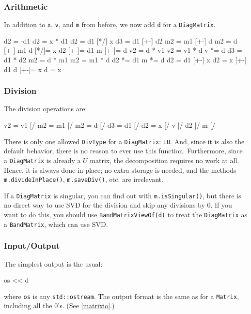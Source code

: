 \documentclass[twoside,letterpaper,11pt]{article}
\renewcommand{\tt}[1]{{\lstinline {#1}}}
\begin{document}
\subsubsection{Arithmetic}

In addition to \tt{x}, \tt{v}, and \tt{m} from before, we now add \tt{d} for a \tt{DiagMatrix}.

\begin{tmvcode}
d2 = -d1
d2 = x * d1
d2 = d1 [*/] x
d3 = d1 [+-] d2
m2 = m1 [+-] d
m2 = d [+-] m1
d [*/]= x
d2 [+-]= d1
m [+-]= d
v2 = d * v1
v2 = v1 * d
v *= d
d3 = d1 * d2
m2 = d * m1
m2 = m1 * d
d2 *= d1
m *= d
d2 = d1 [+-] x
d2 = x [+-] d1
d [+-]= x
d = x
\end{tmvcode}

\subsubsection{Division}

The division operations are:
\begin{tmvcode}
v2 = v1 [/%
m2 = m1 [/%
m2 = d [/%
d3 = d1 [/%
d2 = x [/%
v [/%
d2 [/%
m [/%
\end{tmvcode}

There is only one allowed \tt{DivType} for a \tt{DiagMatrix}: \tt{LU}. 
And, since it is also the default behavior,
there is no reason to ever use this function.  Furthermore, since a \tt{DiagMatrix}
is already a $U$ matrix, the decomposition requires no work at all.
Hence, it is always done in place; no extra storage is needed, and 
the methods \tt{m.divideInPlace()}, \tt{m.saveDiv()}, etc. are irrelevant.

If a \tt{DiagMatrix} is singular, you can find out with \tt{m.isSingular()},
but there is no direct way to use SVD for the division and skip any
divisions by 0.  If you want to do this, you should use \tt{BandMatrixViewOf(d)} to 
treat the \tt{DiagMatrix} as a \tt{BandMatrix}, which can use SVD.

\subsubsection{Input/Output}

The simplest output is the usual:
\begin{tmvcode}
os << d
\end{tmvcode}
where \tt{os} is any \tt{std::ostream}.
The output format is the same as for a \tt{Matrix}, including all the 0's.
(See \ref{matrixio}.)
\end{document}
